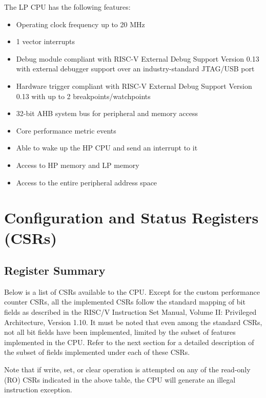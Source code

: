\documentclass[main\_\_EN.tex]{subfiles}
\begin{document}
The LP CPU has the following features:

\begin{itemize}
    \item Operating clock frequency up to 20 MHz
    \item 1 vector interrupts
    \item Debug module compliant with RISC-V External Debug Support Version 0.13 with external debugger support over an industry-standard JTAG/USB port
    \item Hardware trigger compliant with RISC-V External Debug Support Version 0.13 with up to 2 breakpoints/watchpoints
    \item 32-bit AHB system bus for peripheral and memory access
    \item Core performance metric events
    \item Able to wake up the HP CPU and send an interrupt to it
    \item Access to HP memory and LP memory
    \item Access to the entire peripheral address space

\end{itemize}

\section{Configuration and Status Registers (CSRs)}
\hypertarget{ulp-reg-summ}{}
\subsection{Register Summary}
\label{sec:ulp-reg-summ}


Below is a list of CSRs available to the CPU. Except for the custom performance counter CSRs, all the implemented CSRs follow the standard mapping of bit fields as described in the RISC\-/V Instruction Set Manual, Volume II: Privileged Architecture, Version 1.10. It must be noted that even among the standard CSRs, not all bit fields have been implemented, limited by the subset of features implemented in the CPU. Refer to the next section for a detailed description of the subset of fields implemented under each of these CSRs.



Note that if write, set, or clear operation is attempted on any of the read-only (RO) CSRs indicated in the above table, the CPU will generate an illegal instruction exception.
\end{document}
